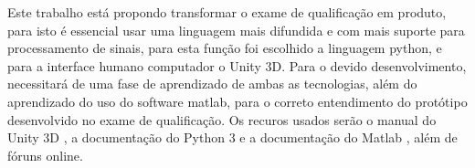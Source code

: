   
   Este trabalho está propondo transformar o exame de qualificação \cite{roberto}
em produto, para isto é essencial usar uma linguagem mais difundida e com mais 
suporte para processamento de sinais, para esta função foi escolhido a
linguagem python, e para a interface humano computador o Unity 3D\cite{unity3d}. 
Para o devido desenvolvimento, necessitará de uma fase de aprendizado de ambas 
as tecnologias, além do aprendizado do uso do software matlab, para o correto
entendimento do protótipo desenvolvido no exame de qualificação. Os recuros 
usados serão o manual do Unity 3D \cite{unity3dManual}, a documentação do 
Python 3 \cite{pythondoc} e a documentação do Matlab \cite{matlabdoc}, além de 
fóruns online.

